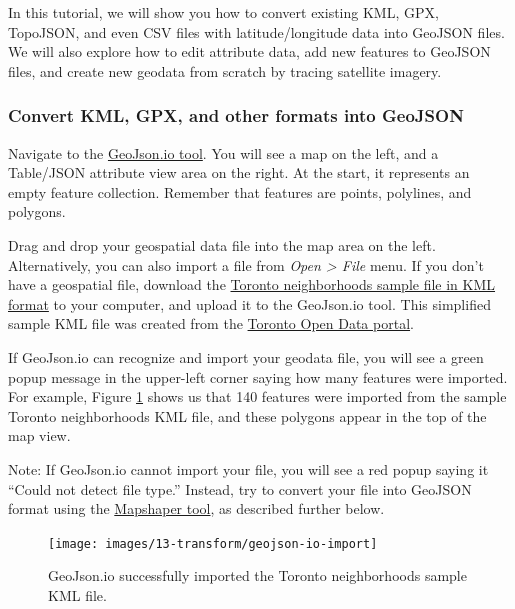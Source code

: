 \documentclass[
  english,
]{book}
\begin{document}
In this tutorial, we will show you how to convert existing KML, GPX, TopoJSON, and even
CSV files with latitude/longitude data into GeoJSON files. We will also explore how to
edit attribute data, add new features to GeoJSON files, and create new geodata from scratch by tracing satellite imagery.

\hypertarget{convert-kml-gpx-and-other-formats-into-geojson}{%
\subsubsection*{Convert KML, GPX, and other formats into GeoJSON}\label{convert-kml-gpx-and-other-formats-into-geojson}}

Navigate to the \href{https://geojson.io}{GeoJson.io tool}. You will see
a map on the left, and a Table/JSON attribute view area on the right. At the start,
it represents an empty feature collection. Remember that features
are points, polylines, and polygons.

Drag and drop your geospatial data file into the map area on the left.
Alternatively, you can also import a file from \emph{Open \textgreater{} File} menu.
If you don't have a geospatial file, download the \href{data/toronto-neighborhoods-sample.kml}{Toronto neighborhoods sample file in KML format}
to your computer, and upload it to the GeoJson.io tool. This simplified sample KML file was created from the \href{https://open.toronto.ca/dataset/neighbourhoods/}{Toronto Open Data portal}.

If GeoJson.io can recognize and import your geodata file,
you will see a green popup message in the upper-left corner saying how many
features were imported. For example, Figure \ref{fig:geojson-io-import} shows us that 140 features were imported from
the sample Toronto neighborhoods KML file, and these polygons appear in the top of the map view.

Note: If GeoJson.io cannot import your file, you will see a red
popup saying it ``Could not detect file type.'' Instead, try to convert your file into GeoJSON format using the \href{mapshaper.html}{Mapshaper tool}, as described further below.



\begin{figure}
\texttt{[image: images/13-transform/geojson-io-import]} \caption{GeoJson.io successfully imported the Toronto neighborhoods sample KML file.}\label{fig:geojson-io-import}
\end{figure}
\end{document}
